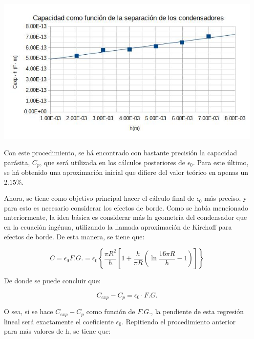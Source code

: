 \documentclass[a4paper,12pt]{article}
\begin{document}
\includegraphics[width=\textwidth]{Grafica 1.jpg}

Con este procedimiento, se há encontrado con bastante precisión la capacidad parásita, $C_p$, que será utilizada en los cálculos posteriores de $\epsilon_0$. Para este último, se há obtenido una aproximación inicial que difiere del valor teórico en apenas un $2.15\%$. 

Ahora, se tiene como objetivo principal hacer el cálculo final de $\epsilon_0$ más preciso, y para esto es necesario considerar los efectos de borde. Como se había mencionado anteriormente, la idea básica es considerar más la geometría del condensador que en la ecuación ingénua, utilizando la llamada aproximación de Kirchoff para efectos de borde. De esta manera, se tiene que:

\begin{equation}
    C = \epsilon_0 F.G. = \epsilon_0 \left\{ \frac{\pi R^2}{h} \left[ 1+\frac{h}{\pi R} \left(\ln{\frac{16\pi R}{h}} -1 \right) \right] \right\}
\end{equation}

De donde se puede concluir que:

\begin{equation}
    C_{exp} - C_p = \epsilon_0 \cdot F.G.
\end{equation}

O sea, si se hace $C_{exp} - C_p$ como función de $F.G.$, la pendiente de esta regresión lineal será exactamente el coeficiente $\epsilon_0$. Repitiendo el procedimiento anterior para más valores de h, se tiene que:
\pagebreak
\end{document}
